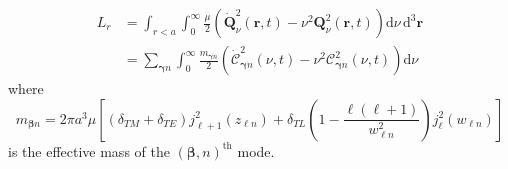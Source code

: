\documentclass{article}
\begin{document}
\begin{equation}
\begin{split}
L_r &= \int_{r<a}\int_0^\infty\frac{\mu}{2}\left(\dot{\mathbf{Q}}_\nu^2(\mathbf{r},t) - \nu^2\mathbf{Q}_\nu^2(\mathbf{r},t)\right)\mathrm{d}\nu\,\mathrm{d}^3\mathbf{r}\\
&= \sum_{\bm{\gamma}n}\int_0^\infty\frac{m_{\bm{\gamma}n}}{2}\left(\dot{\mathcal{C}}_{\bm{\gamma}n}^2(\nu,t) - \nu^2\mathcal{C}_{\bm{\gamma}n}^2(\nu,t)\right)\mathrm{d}\nu
\end{split}
\end{equation}
where
\begin{equation}
m_{\bm{\beta}n} = 2\pi a^3\mu\left[(\delta_{TM} + \delta_{TE})j_{\ell + 1}^2(z_{\ell n}) + \delta_{TL}\left(1 - \frac{\ell(\ell + 1)}{w_{\ell n}^2}\right)j_\ell^2(w_{\ell n})\right]
\end{equation}
is the effective mass of the $(\bm{\beta},n)^\mathrm{th}$ mode.
\end{document}

